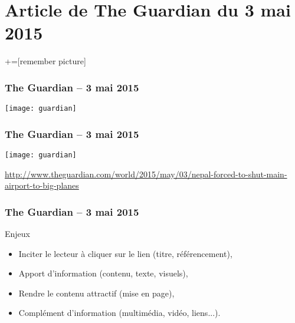 \section{Article de The Guardian du 3 mai 2015}
+=[remember picture]
\begin{frame}
	\frametitle{The Guardian -- 3 mai 2015}
	\hfill
	\texttt{[image: guardian]}
	\hfill \null
\end{frame}
\begin{frame}
	\frametitle{The Guardian -- 3 mai 2015}
	\hfill
	\texttt{[image: guardian]}
	\hfill \null

	\href{http://www.theguardian.com/world/2015/may/03/nepal-forced-to-shut-main-airport-to-big-planes}{http://www.theguardian.com/world/2015/may/03/nepal-forced-to-shut-main-airport-to-big-planes}
\end{frame}
\begin{frame}
	\frametitle{The Guardian -- 3 mai 2015}
	\begin{block}{Enjeux}
		\begin{itemize}
			\item Inciter le lecteur à cliquer sur le lien (titre, référencement),
			\item Apport d'information (contenu, texte, visuels),
			\item Rendre le contenu attractif (mise en page),
			\item Complément d'information (multimédia, vidéo, liens...).
		\end{itemize}		
	\end{block}
\end{frame}

